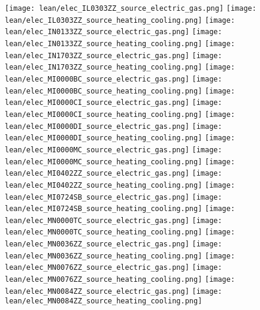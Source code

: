 \texttt{[image: lean/elec\_IL0303ZZ\_source\_electric\_gas.png]}
\texttt{[image: lean/elec\_IL0303ZZ\_source\_heating\_cooling.png]}
\texttt{[image: lean/elec\_IN0133ZZ\_source\_electric\_gas.png]}
\texttt{[image: lean/elec\_IN0133ZZ\_source\_heating\_cooling.png]}
\texttt{[image: lean/elec\_IN1703ZZ\_source\_electric\_gas.png]}
\texttt{[image: lean/elec\_IN1703ZZ\_source\_heating\_cooling.png]}
\texttt{[image: lean/elec\_MI0000BC\_source\_electric\_gas.png]}
\texttt{[image: lean/elec\_MI0000BC\_source\_heating\_cooling.png]}
\texttt{[image: lean/elec\_MI0000CI\_source\_electric\_gas.png]}
\texttt{[image: lean/elec\_MI0000CI\_source\_heating\_cooling.png]}
\texttt{[image: lean/elec\_MI0000DI\_source\_electric\_gas.png]}
\texttt{[image: lean/elec\_MI0000DI\_source\_heating\_cooling.png]}
\texttt{[image: lean/elec\_MI0000MC\_source\_electric\_gas.png]}
\texttt{[image: lean/elec\_MI0000MC\_source\_heating\_cooling.png]}
\texttt{[image: lean/elec\_MI0402ZZ\_source\_electric\_gas.png]}
\texttt{[image: lean/elec\_MI0402ZZ\_source\_heating\_cooling.png]}
\texttt{[image: lean/elec\_MI0724SB\_source\_electric\_gas.png]}
\texttt{[image: lean/elec\_MI0724SB\_source\_heating\_cooling.png]}
\texttt{[image: lean/elec\_MN0000TC\_source\_electric\_gas.png]}
\texttt{[image: lean/elec\_MN0000TC\_source\_heating\_cooling.png]}
\texttt{[image: lean/elec\_MN0036ZZ\_source\_electric\_gas.png]}
\texttt{[image: lean/elec\_MN0036ZZ\_source\_heating\_cooling.png]}
\texttt{[image: lean/elec\_MN0076ZZ\_source\_electric\_gas.png]}
\texttt{[image: lean/elec\_MN0076ZZ\_source\_heating\_cooling.png]}
\texttt{[image: lean/elec\_MN0084ZZ\_source\_electric\_gas.png]}
\texttt{[image: lean/elec\_MN0084ZZ\_source\_heating\_cooling.png]}
